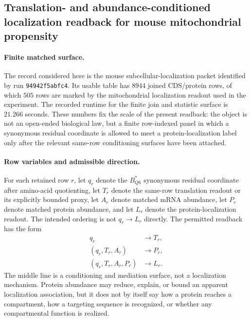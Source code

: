 
\subsection{Translation- and abundance-conditioned localization readback for mouse mitochondrial propensity}
\label{sec:bioreality-q6-mts-localization-mouse-itzhak}

\paragraph{Finite matched surface.}
The record considered here is the mouse subcellular-localization packet identified by run \texttt{94942f5abfc4}.  Its usable table has $8944$ joined CDS/protein rows, of which $505$ rows are marked by the mitochondrial localization readout used in the experiment.  The recorded runtime for the finite join and statistic surface is $21.266$ seconds.  These numbers fix the scale of the present readback: the object is not an open-ended biological law, but a finite row-indexed panel in which a synonymous residual coordinate is allowed to meet a protein-localization label only after the relevant same-row conditioning surfaces have been attached.

\paragraph{Row variables and admissible direction.}
For each retained row $r$, let $q_r$ denote the $B^{*}_{Q6}$ synonymous residual coordinate after amino-acid quotienting, let $T_r$ denote the same-row translation readout or its explicitly bounded proxy, let $A_r$ denote matched mRNA abundance, let $P_r$ denote matched protein abundance, and let $L_r$ denote the protein-localization readout.  The intended ordering is not $q_r \to L_r$ directly.  The permitted readback has the form
$$
\begin{aligned}
q_r &\longrightarrow T_r,\\
(q_r,T_r,A_r) &\longrightarrow P_r,\\
(q_r,T_r,A_r,P_r) &\longrightarrow L_r.
\end{aligned}
$$
The middle line is a conditioning and mediation surface, not a localization mechanism.  Protein abundance may reduce, explain, or bound an apparent localization association, but it does not by itself say how a protein reaches a compartment, how a targeting sequence is recognized, or whether any compartmental function is realized.

